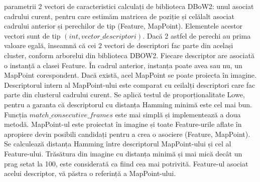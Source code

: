 \documentclass[12pt,a4paper]{report}
\begin{document}
parametrii 2 vectori de caracteristici calculați de biblioteca DBoW2: unul asociat cadrului curent, pentru     
care estimăm matricea de poziție și celălalt asociat cadrului anterior și perechilor de tip (Feature, MapPoint).
Elementele acestor vectori sunt de tip $ (int, vector\_descriptori) $. Dacă 2 astfel de perechi au prima valoare egală,
 înseamnă că cei 2 vectori de descriptori fac parte din același cluster, conform arborelui din biblioteca DBOW2.
Fiecare descriptor are asociată o instanță a clasei Feature. În cadrul anterior, instanța poate avea sau nu, un MapPoint corespondent.
Dacă există, acel MapPoint se poate proiecta în imagine. Descriptorul intern al MapPoint-ului este comparat cu ceilalți 
descriptori care fac parte din clusterul cadrului curent. Se aplică testul de proporționalitate Lowe, pentru a
garanta că descriptorul cu distanța Hamming minimă este cel mai bun. Funcția $ match\_consecutive\_frames $ este mai simplă
și implementează a doua metodă. MapPoint-ul este proiectat în imagine și toate Feature-urile aflate în apropiere devin
posibili candidați pentru a crea o asociere (Feature, MapPoint). Se calculează distanța Hamming între descriptorul 
MapPoint-ului și cel al Feature-ului. Trăsătura din imagine cu distanța minimă și mai mică decât un prag setat la 100, este 
considerată ca fiind cea mai potrivită. Feature-ul asociat acelui descriptor, vă păstra o referință a MapPoint-ului. \\
\end{document}
